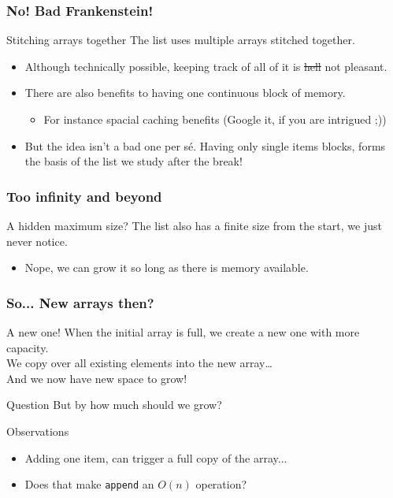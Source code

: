 \begin{frame}
	\frametitle{No! Bad Frankenstein!}
	\begin{alertblock}{Stitching arrays together}
		The list uses multiple arrays stitched together.
		\begin{itemize}
			\item Although technically possible, keeping track of all of it is \st{hell} not pleasant.
			\item There are also benefits to having one continuous block of memory.
				\begin{itemize}
					\item For instance spacial caching benefits (Google it, if you are intrigued ;))
				\end{itemize}
				\pause
			\item But the idea isn't a bad one per sé. Having only single items blocks, forms the basis of the list we study
				after the break!
		\end{itemize}
	\end{alertblock}	
\end{frame}

\begin{frame}
	\frametitle{Too infinity and beyond}
	\begin{alertblock}{A hidden maximum size?}
		The list also has a finite size from the start, we just never notice.
		\begin{itemize}
			\item Nope, we can grow it so long as there is memory available.
		\end{itemize}
	\end{alertblock}	
\end{frame}

\begin{frame}
	\frametitle{So... New arrays then?}
	\begin{exampleblock}{A new one!}
		When the initial array is full, we create a new one with more capacity.\\
		We copy over all existing elements into the new array\dots\\
		And we now have new space to grow!
	\end{exampleblock}	
	\pause
	\begin{questionblock}{Question}
		But by how much should we grow?	
	\end{questionblock}
	\pause
	\begin{block}{Observations}
		\begin{itemize}
			\item Adding one item, can trigger a full copy of the array...
			\item Does that make \texttt{append} an $O(n)$ operation?
		\end{itemize}
	\end{block}	
\end{frame}

